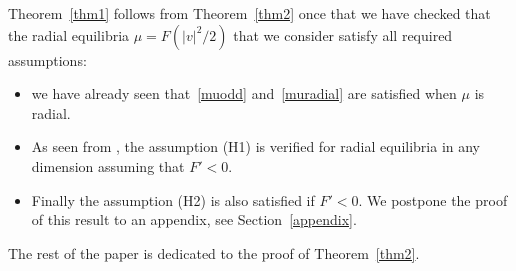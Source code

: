 \documentclass[11pt]{amsart}
\numberwithin{equation}{section}
\begin{document}
Theorem~\ref{thm1} follows from Theorem~\ref{thm2} once that we have checked that the radial equilibria  $\mu= F(|v|^2/2)$ that we consider satisfy all required assumptions:
\begin{itemize}

\item we have already seen that~\eqref{muodd} and~\eqref{muradial} are satisfied when $\mu$ is radial.

\item 
As seen from \cite[Proposition 2.1 and Remark 2.2]{MV}, the assumption (H1) is verified for radial equilibria in any dimension assuming
that  $F' <0$.

\item  Finally the assumption (H2) is 	also  satisfied if $F'<0$. We postpone the proof of this result to an appendix, see Section~\ref{appendix}.

\end{itemize}

The rest of the paper is dedicated to the proof of Theorem~\ref{thm2}. %
\end{document}
